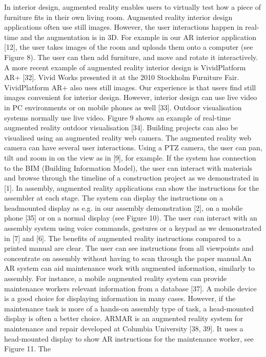 In interior design, augmented reality enables users to virtually test how a piece of
furniture fits in their own living room. Augmented reality interior design applications
often use still images. However, the user interactions happen in real-time and the
augmentation is in 3D. For example in our AR interior application [12], the user
takes images of the room and uploads them onto a computer (see Figure 8). The
user can then add furniture, and move and rotate it interactively. A more recent
example of augmented reality interior design is VividPlatform AR+ [32]. Vivid
Works presented it at the 2010 Stockholm Furniture Fair. VividPlatform AR+ also
uses still images. Our experience is that users find still images convenient for interior design. However, interior design can use live video in PC environments or
on mobile phones as well [33].
Outdoor visualisation systems normally use live video. Figure 9 shows an example
of real-time augmented reality outdoor visualisation [34].
Building projects can also be visualised using an augmented reality web camera.
The augmented reality web camera can have several user interactions. Using a
PTZ camera, the user can pan, tilt and zoom in on the view as in [9], for example.
If the system has connection to the BIM (Building Information Model), the user can
interact with materials and browse through the timeline of a construction project as
we demonstrated in [1].
In assembly, augmented reality applications can show the instructions for the
assembler at each stage. The system can display the instructions on a headmounted
display as e.g. in our assembly demonstration [2], on a mobile phone
[35] or on a normal display (see Figure 10). The user can interact with an assembly
system using voice commands, gestures or a keypad as we demonstrated in
[7] and [6]. The benefits of augmented reality instructions compared to a printed manual are clear. The user can see instructions from all viewpoints and concentrate
on assembly without having to scan through the paper manual.An AR system can aid maintenance work with augmented information, similarly to
assembly. For instance, a mobile augmented reality system can provide maintenance
workers relevant information from a database [37]. A mobile device is a
good choice for displaying information in many cases. However, if the maintenance
task is more of a hands-on assembly type of task, a head-mounted display
is often a better choice. ARMAR is an augmented reality system for maintenance
and repair developed at Columbia University [38, 39]. It uses a head-mounted
display to show AR instructions for the maintenance worker, see Figure 11. The
